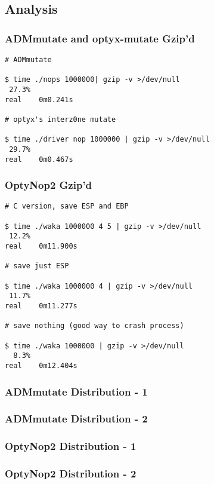 \documentclass{beamer}
\begin{document}
\subsection{Analysis}

\begin{frame}[fragile]
  \frametitle{ADMmutate and optyx-mutate Gzip'd}
  {\footnotesize
  \begin{verbatim}
# ADMmutate

$ time ./nops 1000000| gzip -v >/dev/null
 27.3%
real    0m0.241s

# optyx's interz0ne mutate

$ time ./driver nop 1000000 | gzip -v >/dev/null
 29.7%
real    0m0.467s
\end{verbatim}
}
\end{frame}

\begin{frame}[fragile]
  \frametitle{OptyNop2 Gzip'd}
  {\footnotesize
  \begin{verbatim}
# C version, save ESP and EBP

$ time ./waka 1000000 4 5 | gzip -v >/dev/null
 12.2%
real    0m11.900s

# save just ESP

$ time ./waka 1000000 4 | gzip -v >/dev/null
 11.7%
real    0m11.277s

# save nothing (good way to crash process)

$ time ./waka 1000000 | gzip -v >/dev/null
  8.3%
real    0m12.404s
\end{verbatim}
}
\end{frame}

\begin{frame}[fragile]
  \frametitle{ADMmutate Distribution - 1}
  
\end{frame}
\begin{frame}[fragile]
  \frametitle{ADMmutate Distribution - 2}
  
\end{frame}
\begin{frame}[fragile]
  \frametitle{OptyNop2 Distribution - 1}
  
\end{frame}
\begin{frame}[fragile]
  \frametitle{OptyNop2 Distribution - 2}
  
\end{frame}
\end{document}
